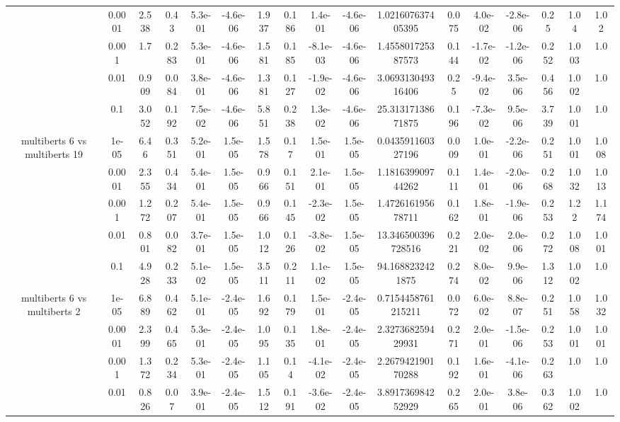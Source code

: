 \begin{tabular}{|c|c|c|c|c|c|c|c|c|c|c|c|c|c|c|c|c|}
 & 0.0001 & 2.538 & 0.43 & 5.3e-01 & -4.6e-06 & 1.937 & 0.186 & 1.4e-01 & -4.6e-06 & 1.021607637405395 & 0.075 & 4.0e-02 & -2.8e-06 & 0.25 & 1.04 & 1.02 \\
 & 0.001 & 1.7 & 0.283 & 5.3e-01 & -4.6e-06 & 1.581 & 0.185 & -8.1e-03 & -4.6e-06 & 1.455801725387573 & 0.144 & -1.7e-02 & -1.2e-06 & 0.252 & 1.003 & 1.0 \\
 & 0.01 & 0.909 & 0.084 & 3.8e-01 & -4.6e-06 & 1.381 & 0.127 & -1.9e-02 & -4.6e-06 & 3.069313049316406 & 0.25 & -9.4e-02 & 3.5e-06 & 0.456 & 1.002 & 1.0 \\
 & 0.1 & 3.052 & 0.192 & 7.5e-02 & -4.6e-06 & 5.851 & 0.238 & 1.3e-02 & -4.6e-06 & 25.31317138671875 & 0.196 & -7.3e-02 & 9.5e-06 & 3.739 & 1.001 & 1.0 \\
\hline
\multirow{5}{*}{multiberts 6 vs multiberts 19} & 1e-05 & 6.46 & 0.351 & 5.2e-01 & 1.5e-05 & 1.578 & 0.17 & 1.5e-01 & 1.5e-05 & 0.043591160327196 & 0.009 & 1.0e-01 & -2.2e-06 & 0.251 & 1.001 & 1.008 \\
 & 0.0001 & 2.355 & 0.434 & 5.4e-01 & 1.5e-05 & 0.966 & 0.151 & 2.1e-01 & 1.5e-05 & 1.181639909744262 & 0.111 & 1.4e-01 & -2.0e-06 & 0.268 & 1.032 & 1.013 \\
 & 0.001 & 1.272 & 0.207 & 5.4e-01 & 1.5e-05 & 0.966 & 0.145 & -2.3e-02 & 1.5e-05 & 1.472616195678711 & 0.162 & 1.8e-01 & -1.9e-06 & 0.253 & 1.22 & 1.174 \\
 & 0.01 & 0.801 & 0.082 & 3.7e-01 & 1.5e-05 & 1.012 & 0.126 & -3.8e-02 & 1.5e-05 & 13.346500396728516 & 0.221 & 2.0e-02 & 2.0e-06 & 0.272 & 1.008 & 1.001 \\
 & 0.1 & 4.928 & 0.233 & 5.1e-02 & 1.5e-05 & 3.511 & 0.211 & 1.1e-02 & 1.5e-05 & 94.1688232421875 & 0.274 & 8.0e-02 & 9.9e-06 & 1.312 & 1.002 & 1.0 \\
\hline
\multirow{5}{*}{multiberts 6 vs multiberts 2} & 1e-05 & 6.889 & 0.462 & 5.1e-01 & -2.4e-05 & 1.692 & 0.179 & 1.5e-01 & -2.4e-05 & 0.7154458761215211 & 0.072 & 6.0e-02 & 8.8e-07 & 0.251 & 1.058 & 1.032 \\
 & 0.0001 & 2.399 & 0.465 & 5.3e-01 & -2.4e-05 & 1.095 & 0.135 & 1.8e-01 & -2.4e-05 & 2.327368259429931 & 0.271 & 2.0e-01 & -1.5e-06 & 0.253 & 1.001 & 1.001 \\
 & 0.001 & 1.372 & 0.234 & 5.3e-01 & -2.4e-05 & 1.105 & 0.14 & -4.1e-02 & -2.4e-05 & 2.267942190170288 & 0.192 & 1.6e-01 & -4.1e-06 & 0.263 & 1.0 & 1.0 \\
 & 0.01 & 0.826 & 0.07 & 3.9e-01 & -2.4e-05 & 1.512 & 0.191 & -3.6e-02 & -2.4e-05 & 3.891736984252929 & 0.265 & 2.0e-01 & 3.8e-06 & 0.362 & 1.002 & 1.0 \\

\end{tabular}

